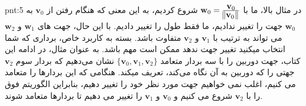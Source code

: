 {\begin{spacing}{1.5}
        \begin{point}{pnt:5}
            \Large
            در مثال بالا، ما با $\textbf{w}_{0}=\frac{\displaystyle\textbf{v}_{0}}{\displaystyle\norm{\textbf{v}_{0}}}$ شروع کردیم، به این معنی که هنگام رفتن از $\textbf{v}_{0}$ به $\textbf{w}_{0}$ جهت را تغییر ندادیم،
            ما فقط طول را تغییر دادیم.
            با این حال، جهت های $\textbf{w}_{1}$ و $\textbf{w}_{2}$ می تواند به ترتیب با $\textbf{v}_{1}$ و $\textbf{v}_{2}$ متفاوت باشد.
            بسته به کاربرد خاص، برداری که شما انتخاب میکنید تغییر جهت ندهد ممکن است مهم باشد.
            به عنوان مثال، در ادامه این کتاب، جهت دوربین را با سه بردار متعامد $\{\textbf{v}_{0},\textbf{v}_{1},\textbf{v}_{2}\}$ نشان می‌دهیم که بردار سوم $\textbf{v}_{2}$ جهتی را که دوربین به آن نگاه می‌کند، تعریف میکند.
            هنگامی که این بردارها را متعامد می کنیم، اغلب نمی خواهیم جهت مورد نظر خود را تغییر دهیم،
            بنابراین الگوریتم فوق را با $\textbf{v}_{2}$ شروع می کنیم و $\textbf{v}_{0}$ و $\textbf{v}_{1}$ را تغییر می دهیم تا بردارها متعامد شوند.
        \end{point}
    \end{spacing}
}


